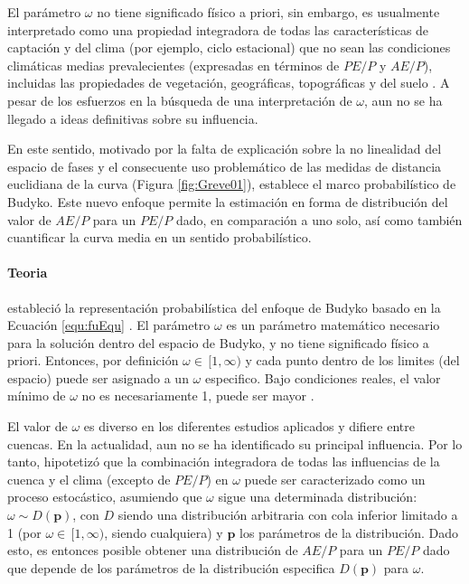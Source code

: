 \documentclass[12pt]{article}
\begin{document}
El parámetro $\omega$ \citep[Ecuación \ref{equ:fuEqu}]{Fu1981} no tiene significado físico a priori, sin embargo, es usualmente interpretado como una propiedad integradora de todas las características de captación y del clima (por ejemplo, ciclo estacional) que no sean las condiciones climáticas medias prevalecientes (expresadas en términos de $PE/P$ y $AE/P$), incluidas las propiedades de vegetación, geográficas, topográficas y del suelo \citep{Gentine2012,Berghuijs2014,Greve2015}. A pesar de los esfuerzos en la búsqueda de una interpretación de $\omega$, aun no se ha llegado a ideas definitivas sobre su influencia.



En este sentido, \citet{Greve2015} motivado por la falta de explicación sobre la no linealidad del espacio de fases y el consecuente uso problemático de las medidas de distancia euclidiana de la curva (Figura \ref{fig:Greve01}), establece el marco probabilístico de Budyko. Este nuevo enfoque permite la estimación en forma de distribución del valor de $AE/P$ para un $PE/P$ dado, en comparación a uno solo, así como también cuantificar la curva media en un sentido probabilístico.

\paragraph{Teoria}\mbox{}

\citet{Greve2015} estableció la representación probabilística del enfoque de Budyko basado en la Ecuación \ref{equ:fuEqu} \citep{Fu1981}. El parámetro $\omega$ es un parámetro matemático necesario para la solución dentro del espacio de Budyko, y no tiene significado físico a priori. Entonces, por definición $\omega \in\,[1,\infty)$ y cada punto dentro de los limites (del espacio) puede ser asignado a un $\omega$ especifico. Bajo condiciones reales, el valor mínimo de $\omega$ no es necesariamente 1, puede ser mayor \citep{Zhang2004}. 

El valor de $\omega$ es diverso en los diferentes estudios aplicados y difiere entre cuencas. En la actualidad, aun no se ha identificado su principal influencia. Por lo tanto, \citet{Greve2015} hipotetizó que la combinación integradora de todas las influencias de la cuenca y el clima (excepto de $PE/P$) en $\omega$ puede ser caracterizado como un proceso estocástico, asumiendo que $\omega$ sigue una determinada distribución: $\omega \sim D(\textbf{p})$, con $D$ siendo una distribución arbitraria con cola inferior limitado a 1 (por $\omega \in\,[1,\infty)$, siendo cualquiera) y $\textbf{p}$ los parámetros de la distribución. Dado esto, es entonces posible obtener una distribución de $AE/P$ para un $PE/P$ dado que depende de los parámetros de la distribución especifica $D(\textbf{p})$ para $\omega$.
\end{document}

